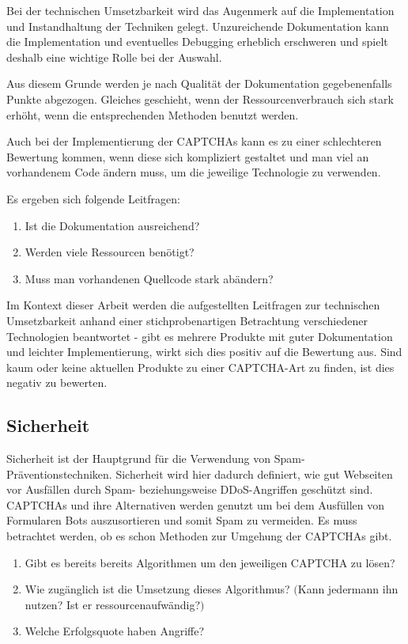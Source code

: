 Bei der technischen Umsetzbarkeit wird das Augenmerk auf die Implementation und Instandhaltung der Techniken gelegt.
Unzureichende Dokumentation kann die Implementation und eventuelles Debugging erheblich erschweren
und spielt deshalb eine wichtige Rolle bei der Auswahl.

Aus diesem Grunde werden je nach Qualität der Dokumentation gegebenenfalls Punkte abgezogen.
Gleiches geschieht, wenn der Ressourcenverbrauch sich stark erhöht, wenn die entsprechenden Methoden benutzt werden.

Auch bei der Implementierung der CAPTCHAs kann es zu einer schlechteren Bewertung kommen, wenn diese sich kompliziert gestaltet und man viel an vorhandenem Code ändern muss,
um die jeweilige Technologie zu verwenden.

Es ergeben sich folgende Leitfragen:
\begin{enumerate}
    \item Ist die Dokumentation ausreichend? 
    \item Werden viele Ressourcen benötigt?
    \item Muss man vorhandenen Quellcode stark abändern?
\end{enumerate}

Im Kontext dieser Arbeit werden die aufgestellten Leitfragen zur technischen Umsetzbarkeit anhand einer stichprobenartigen Betrachtung verschiedener 
Technologien beantwortet - gibt es mehrere Produkte mit guter Dokumentation und leichter Implementierung,
wirkt sich dies positiv auf die Bewertung aus.
Sind kaum oder keine aktuellen Produkte zu einer CAPTCHA-Art zu finden, ist dies negativ zu bewerten.

\subsection{Sicherheit}
\label{ch:matrix:aspekte:sicherheit}
Sicherheit ist der Hauptgrund für die Verwendung von Spam-Präventions\-techniken.
Sicherheit wird hier dadurch definiert, wie gut Webseiten vor Ausfällen durch Spam- beziehungsweise DDoS-Angriffen geschützt sind.
CAPTCHAs und ihre Alternativen werden genutzt um bei dem Ausfüllen von Formularen Bots auszusortieren und somit Spam zu vermeiden.
Es muss betrachtet werden, ob es schon Methoden zur Umgehung der CAPTCHAs gibt.
\begin{enumerate}
    \item Gibt es bereits bereits Algorithmen um den jeweiligen CAPTCHA zu lösen?
    \item Wie zugänglich ist die Umsetzung dieses Algorithmus? $($Kann jedermann ihn nutzen? Ist er ressourcenaufwändig?$)$
    \item Welche Erfolgsquote haben Angriffe?
\end{enumerate}


